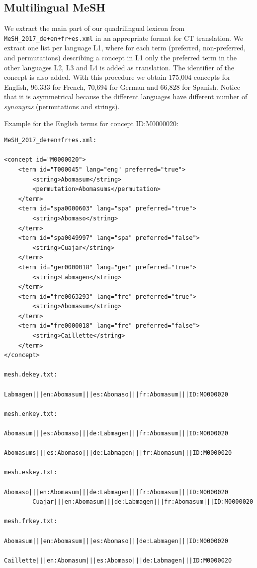 \documentclass[a4paper,11pt]{article}
\begin{document}
\subsection{Multilingual MeSH}
\label{ss:meshLex}

We extract the main part of our quadrilingual lexicon from {\tt MeSH\_2017\_de+en+fr+es.xml} in an appropriate format for CT translation. We extract one list per language L1, where for each term (preferred, non-preferred, and permutations) describing a concept in L1 only the preferred term in the other languages L2, L3 and L4 is added as translation. The identifier of the concept is also added. With this procedure we obtain 175,004 concepts for English, 96,333 for French, 70,694 for German and 66,828 for Spanish. Notice that it is asymmetrical because the different languages have different number of \emph{synonyms} (permutations and strings).

\bigskip
\noindent Example for the English terms for concept ID:M0000020: 

{\small 
\begin{verbatim}
MeSH_2017_de+en+fr+es.xml:
 
<concept id="M0000020">
	<term id="T000045" lang="eng" preferred="true">
		<string>Abomasum</string>
		<permutation>Abomasums</permutation>
	</term>
	<term id="spa0000603" lang="spa" preferred="true">
		<string>Abomaso</string>
	</term>
	<term id="spa0049997" lang="spa" preferred="false">
		<string>Cuajar</string>
	</term>
	<term id="ger0000018" lang="ger" preferred="true">
		<string>Labmagen</string>
	</term>
	<term id="fre0063293" lang="fre" preferred="true">
		<string>Abomasum</string>
	</term>
	<term id="fre0000018" lang="fre" preferred="false">
		<string>Caillette</string>
	</term>
</concept>

mesh.dekey.txt:
        Labmagen|||en:Abomasum|||es:Abomaso|||fr:Abomasum|||ID:M0000020
  
mesh.enkey.txt:
        Abomasum|||es:Abomaso|||de:Labmagen|||fr:Abomasum|||ID:M0000020
        Abomasums|||es:Abomaso|||de:Labmagen|||fr:Abomasum|||ID:M0000020
        
mesh.eskey.txt:       
        Abomaso|||en:Abomasum|||de:Labmagen|||fr:Abomasum|||ID:M0000020
        Cuajar|||en:Abomasum|||de:Labmagen|||fr:Abomasum|||ID:M0000020

mesh.frkey.txt:  
        Abomasum|||en:Abomasum|||es:Abomaso|||de:Labmagen|||ID:M0000020
        Caillette|||en:Abomasum|||es:Abomaso|||de:Labmagen|||ID:M0000020
\end{verbatim}
}
\end{document}
